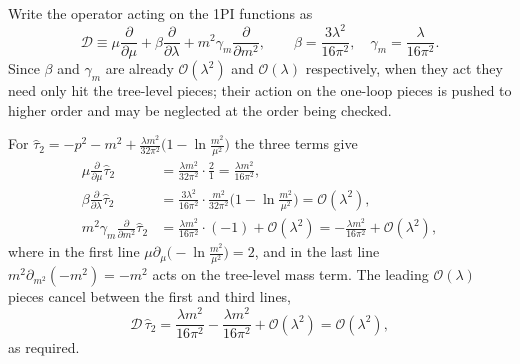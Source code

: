 \begin{solution}
 Write the operator acting on the 1PI functions as
\begin{equation}
    \mathcal{D} \equiv \mu\frac{\partial}{\partial\mu} + \beta\frac{\partial}{\partial\lambda} + m^2\gamma_m\frac{\partial}{\partial m^2},
    \qquad \beta = \frac{3\lambda^2}{16\pi^2}, \quad \gamma_m = \frac{\lambda}{16\pi^2}.
\end{equation}
Since $\beta$ and $\gamma_m$ are already $\mathcal{O}(\lambda^2)$ and $\mathcal{O}(\lambda)$ respectively, when they act they need only hit the tree-level pieces; their action on the one-loop pieces is pushed to higher order and may be neglected at the order being checked.
 
For $\hat\tau_2 = -p^2 - m^2 + \frac{\lambda m^2}{32\pi^2}\big(1 - \ln\frac{m^2}{\mu^2}\big)$ the three terms give
\begin{align}
    \mu\frac{\partial}{\partial\mu}\hat\tau_2 &= \frac{\lambda m^2}{32\pi^2}\cdot\frac{2}{1} = \frac{\lambda m^2}{16\pi^2}, \\
    \beta\frac{\partial}{\partial\lambda}\hat\tau_2 &= \frac{3\lambda^2}{16\pi^2}\cdot\frac{m^2}{32\pi^2}\Big(1 - \ln\frac{m^2}{\mu^2}\Big) = \mathcal{O}(\lambda^2), \\
    m^2\gamma_m\frac{\partial}{\partial m^2}\hat\tau_2 &= \frac{\lambda m^2}{16\pi^2}\cdot(-1) + \mathcal{O}(\lambda^2) = -\frac{\lambda m^2}{16\pi^2} + \mathcal{O}(\lambda^2),
\end{align}
where in the first line $\mu\partial_\mu\big(-\ln\frac{m^2}{\mu^2}\big) = 2$, and in the last line $m^2\partial_{m^2}(-m^2) = -m^2$ acts on the tree-level mass term. The leading $\mathcal{O}(\lambda)$ pieces cancel between the first and third lines,
\begin{equation}
    \mathcal{D}\,\hat\tau_2 = \frac{\lambda m^2}{16\pi^2} - \frac{\lambda m^2}{16\pi^2} + \mathcal{O}(\lambda^2) = \mathcal{O}(\lambda^2),
\end{equation}
as required.
 

\end{solution}
